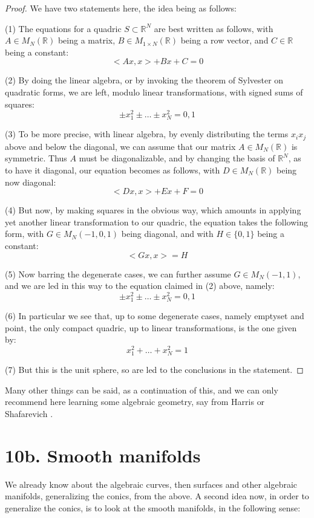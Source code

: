 \documentclass[12pt]{amsbook}
\begin{document}
\begin{proof}
We have two statements here, the idea being as follows:

\medskip

(1) The equations for a quadric $S\subset\mathbb R^N$ are best written as follows, with $A\in M_N(\mathbb R)$ being a matrix, $B\in M_{1\times N}(\mathbb R)$ being a row vector, and $C\in\mathbb R$ being a constant:
$$<Ax,x>+Bx+C=0$$

(2) By doing the linear algebra, or by invoking the theorem of Sylvester on quadratic forms, we are left, modulo linear transformations, with signed sums of squares:
$$\pm x_1^2\pm\ldots\pm x_N^2=0,1$$

(3) To be more precise, with linear algebra, by evenly distributing the terms $x_ix_j$ above and below the diagonal, we can assume that our matrix $A\in M_N(\mathbb R)$ is symmetric. Thus $A$ must be diagonalizable, and by changing the basis of $\mathbb R^N$, as to have it diagonal, our equation becomes as follows, with $D\in M_N(\mathbb R)$ being now diagonal:
$$<Dx,x>+Ex+F=0$$

(4) But now, by making squares in the obvious way, which amounts in applying yet another linear transformation to our quadric, the equation takes the following form, with $G\in M_N(-1,0,1)$ being diagonal, and with $H\in\{0,1\}$ being a constant:
$$<Gx,x>=H$$

(5) Now barring the degenerate cases, we can further assume $G\in M_N(-1,1)$, and we are led in this way to the equation claimed in (2) above, namely:
$$\pm x_1^2\pm\ldots\pm x_N^2=0,1$$

(6) In particular we see that, up to some degenerate cases, namely emptyset and point, the only compact quadric, up to linear transformations, is the one given by:
$$x_1^2+\ldots+x_N^2=1$$

(7) But this is the unit sphere, so are led to the conclusions in the statement.
\end{proof}

Many other things can be said, as a continuation of this, and we can only recommend here learning some algebraic geometry, say from Harris \cite{har} or Shafarevich \cite{sha}.

\section*{10b. Smooth manifolds}

We already know about the algebraic curves, then surfaces and other algebraic manifolds, generalizing the conics, from the above. A second idea now, in order to generalize the conics, is to look at the smooth manifolds, in the following sense:
\end{document}
